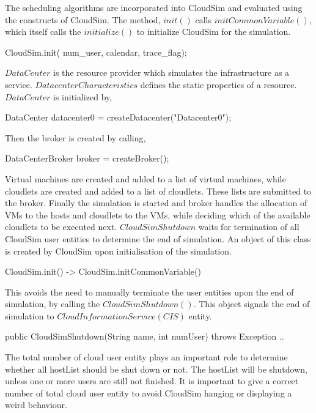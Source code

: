 \documentclass[times, 10pt,twocolumn]{article}
\begin{document}
The scheduling algorithms are incorporated into CloudSim and evaluated using the constructs of CloudSim. The method, $init()$ calls $initCommonVariable()$, which itself calls the $initialize()$ to initialize CloudSim for the simulation.
\begin{verbatimtab}
CloudSim.init(
    num_user, calendar, trace_flag);
\end{verbatimtab}
$DataCenter$ is the resource provider which simulates the infrastructure as a service. $DatacenterCharacteristics$ defines the static properties of a resource. $DataCenter$ is initialized by,
\begin{verbatimtab}
DataCenter datacenter0 = 
    createDatacenter("Datacenter0");
\end{verbatimtab}
Then the broker is created by calling,
\begin{verbatimtab}
DataCenterBroker broker = createBroker();
\end{verbatimtab}
Virtual machines are created and added to a list of virtual machines, while cloudlets are created and added to a list of cloudlets. These lists are submitted to the broker. Finally the simulation is started and broker handles the allocation of VMs to the hosts and cloudlets to the VMs, while deciding which of the available cloudlets to be executed next. $CloudSimShutdown$ waits for termination of all CloudSim user entities to determine the end of simulation. An object of this class is created by CloudSim upon initialisation of the simulation.
\begin{verbatimtab}
CloudSim.init() -> 
    CloudSim.initCommonVariable()
\end{verbatimtab}
This avoids the need to manually terminate the user entities upon the end of simulation, by calling the $CloudSimShutdown()$. This object signals the end of simulation to $CloudInformationService (CIS)$ entity.
\begin{verbatimtab}
public CloudSimShutdown(String name,
    int numUser) throws Exception { .. }
\end{verbatimtab}
The total number of cloud user entity plays an important role to determine whether all hostList should be shut down or not. The hostList will be shutdown, unless one or more users are still not finished. It is important to give a correct number of total cloud user entity to avoid CloudSim hanging or displaying a weird behaviour. 
\end{document}
